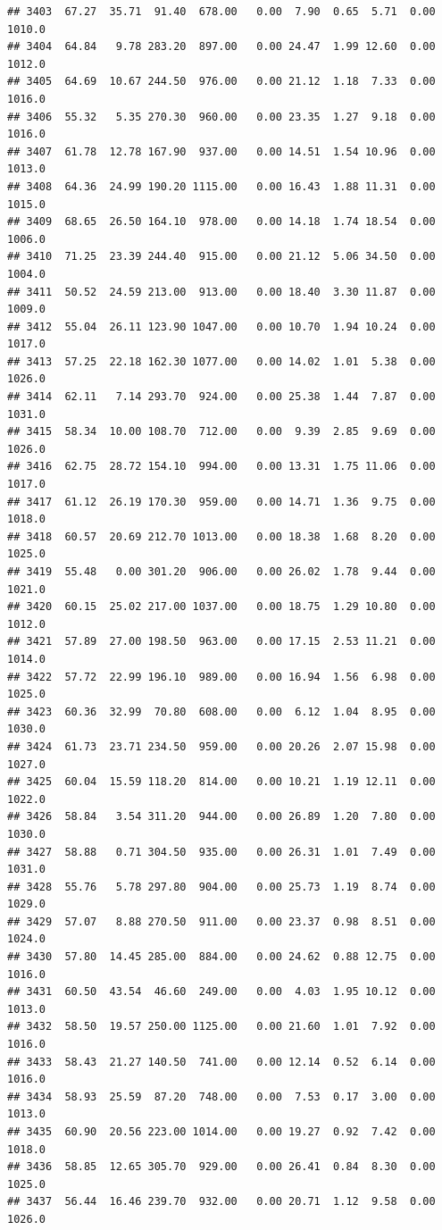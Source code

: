 \documentclass{article}\usepackage{graphicx, color}
\makeatletter
\newenvironment{kframe}{%
 \def\at@end@of@kframe{}%
 \ifinner\ifhmode%
  \def\at@end@of@kframe{\end{minipage}}%
  \begin{minipage}{\columnwidth}%
 \fi\fi%
 \def\FrameCommand##1{\hskip\@totalleftmargin \hskip-\fboxsep
 \colorbox{shadecolor}{##1}\hskip-\fboxsep
     \hskip-\linewidth \hskip-\@totalleftmargin \hskip\columnwidth}%
 \MakeFramed {\advance\hsize-\width
   \@totalleftmargin\z@ \linewidth\hsize
   \@setminipage}}%
 {\par\unskip\endMakeFramed%
 \at@end@of@kframe}
\newenvironment{knitrout}{}{} %
\makeatother
\begin{document}
\begin{knitrout}
\begin{kframe}
\begin{verbatim}
## 3403  67.27  35.71  91.40  678.00   0.00  7.90  0.65  5.71  0.00 1010.0
## 3404  64.84   9.78 283.20  897.00   0.00 24.47  1.99 12.60  0.00 1012.0
## 3405  64.69  10.67 244.50  976.00   0.00 21.12  1.18  7.33  0.00 1016.0
## 3406  55.32   5.35 270.30  960.00   0.00 23.35  1.27  9.18  0.00 1016.0
## 3407  61.78  12.78 167.90  937.00   0.00 14.51  1.54 10.96  0.00 1013.0
## 3408  64.36  24.99 190.20 1115.00   0.00 16.43  1.88 11.31  0.00 1015.0
## 3409  68.65  26.50 164.10  978.00   0.00 14.18  1.74 18.54  0.00 1006.0
## 3410  71.25  23.39 244.40  915.00   0.00 21.12  5.06 34.50  0.00 1004.0
## 3411  50.52  24.59 213.00  913.00   0.00 18.40  3.30 11.87  0.00 1009.0
## 3412  55.04  26.11 123.90 1047.00   0.00 10.70  1.94 10.24  0.00 1017.0
## 3413  57.25  22.18 162.30 1077.00   0.00 14.02  1.01  5.38  0.00 1026.0
## 3414  62.11   7.14 293.70  924.00   0.00 25.38  1.44  7.87  0.00 1031.0
## 3415  58.34  10.00 108.70  712.00   0.00  9.39  2.85  9.69  0.00 1026.0
## 3416  62.75  28.72 154.10  994.00   0.00 13.31  1.75 11.06  0.00 1017.0
## 3417  61.12  26.19 170.30  959.00   0.00 14.71  1.36  9.75  0.00 1018.0
## 3418  60.57  20.69 212.70 1013.00   0.00 18.38  1.68  8.20  0.00 1025.0
## 3419  55.48   0.00 301.20  906.00   0.00 26.02  1.78  9.44  0.00 1021.0
## 3420  60.15  25.02 217.00 1037.00   0.00 18.75  1.29 10.80  0.00 1012.0
## 3421  57.89  27.00 198.50  963.00   0.00 17.15  2.53 11.21  0.00 1014.0
## 3422  57.72  22.99 196.10  989.00   0.00 16.94  1.56  6.98  0.00 1025.0
## 3423  60.36  32.99  70.80  608.00   0.00  6.12  1.04  8.95  0.00 1030.0
## 3424  61.73  23.71 234.50  959.00   0.00 20.26  2.07 15.98  0.00 1027.0
## 3425  60.04  15.59 118.20  814.00   0.00 10.21  1.19 12.11  0.00 1022.0
## 3426  58.84   3.54 311.20  944.00   0.00 26.89  1.20  7.80  0.00 1030.0
## 3427  58.88   0.71 304.50  935.00   0.00 26.31  1.01  7.49  0.00 1031.0
## 3428  55.76   5.78 297.80  904.00   0.00 25.73  1.19  8.74  0.00 1029.0
## 3429  57.07   8.88 270.50  911.00   0.00 23.37  0.98  8.51  0.00 1024.0
## 3430  57.80  14.45 285.00  884.00   0.00 24.62  0.88 12.75  0.00 1016.0
## 3431  60.50  43.54  46.60  249.00   0.00  4.03  1.95 10.12  0.00 1013.0
## 3432  58.50  19.57 250.00 1125.00   0.00 21.60  1.01  7.92  0.00 1016.0
## 3433  58.43  21.27 140.50  741.00   0.00 12.14  0.52  6.14  0.00 1016.0
## 3434  58.93  25.59  87.20  748.00   0.00  7.53  0.17  3.00  0.00 1013.0
## 3435  60.90  20.56 223.00 1014.00   0.00 19.27  0.92  7.42  0.00 1018.0
## 3436  58.85  12.65 305.70  929.00   0.00 26.41  0.84  8.30  0.00 1025.0
## 3437  56.44  16.46 239.70  932.00   0.00 20.71  1.12  9.58  0.00 1026.0

\end{verbatim}
\end{kframe}
\end{knitrout}
\end{document}
